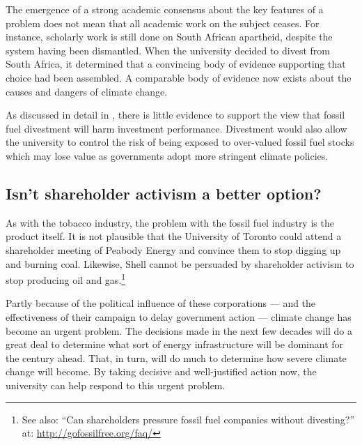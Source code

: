 


The emergence of a strong academic consensus about the key features of a problem does not mean that all academic work on the subject ceases.
For instance, scholarly work is still done on South African apartheid, despite the system having been dismantled.
When the university decided to divest from South Africa, it determined that a convincing body of evidence supporting that choice had been assembled.
A comparable body of evidence now exists about the causes and dangers of climate change.



As discussed in detail in , there is little evidence to support the view that fossil fuel divestment will harm investment performance.
Divestment would also allow the university to control the risk of being exposed to over-valued fossil fuel stocks which may lose value as governments adopt more stringent climate policies.



	\subsection{Isn't shareholder activism a better option?}
	\label{ShareholderActivism}
	


As with the tobacco industry, the problem with the fossil fuel industry is the product itself.
It is not plausible that the University of Toronto could attend a shareholder meeting of Peabody Energy and convince them to stop digging up and burning coal.
Likewise, Shell cannot be persuaded by shareholder activism to stop producing oil and gas.\footnote{See also: ``Can shareholders pressure fossil fuel companies without divesting?'' at: \url{http://gofossilfree.org/faq/}}



Partly because of the political influence of these corporations --- and the effectiveness of their campaign to delay government action --- climate change has become an urgent problem.
The decisions made in the next few decades will do a great deal to determine what sort of energy infrastructure will be dominant for the century ahead.
That, in turn, will do much to determine how severe climate change will become.
By taking decisive and well-justified action now, the university can help respond to this urgent problem.

	
	
